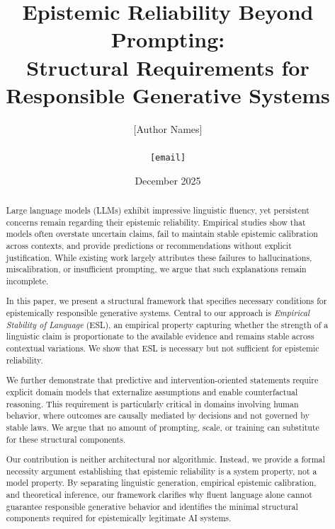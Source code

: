 \documentclass[11pt,a4paper]{article}
\title{\textbf{Epistemic Reliability Beyond Prompting:\\Structural Requirements for Responsible Generative Systems}}
\author{
  [Author Names]\\
  [Affiliation]\\
  \texttt{[email]}
}
\date{December 2025}
\begin{document}

\maketitle

\begin{abstract}
Large language models (LLMs) exhibit impressive linguistic fluency, yet persistent concerns remain regarding their epistemic reliability. Empirical studies show that models often overstate uncertain claims, fail to maintain stable epistemic calibration across contexts, and provide predictions or recommendations without explicit justification. While existing work largely attributes these failures to hallucinations, miscalibration, or insufficient prompting, we argue that such explanations remain incomplete.

In this paper, we present a structural framework that specifies necessary conditions for epistemically responsible generative systems. Central to our approach is \emph{Empirical Stability of Language} (ESL), an empirical property capturing whether the strength of a linguistic claim is proportionate to the available evidence and remains stable across contextual variations. We show that ESL is necessary but not sufficient for epistemic reliability.

We further demonstrate that predictive and intervention-oriented statements require explicit domain models that externalize assumptions and enable counterfactual reasoning. This requirement is particularly critical in domains involving human behavior, where outcomes are causally mediated by decisions and not governed by stable laws. We argue that no amount of prompting, scale, or training can substitute for these structural components.

Our contribution is neither architectural nor algorithmic. Instead, we provide a formal necessity argument establishing that epistemic reliability is a system property, not a model property. By separating linguistic generation, empirical epistemic calibration, and theoretical inference, our framework clarifies why fluent language alone cannot guarantee responsible generative behavior and identifies the minimal structural components required for epistemically legitimate AI systems.
\end{abstract}
\end{document}
